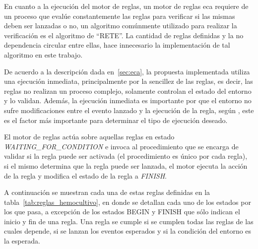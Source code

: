 
En cuanto a la ejecución del motor de reglas, un motor de reglas \gls{eca} requiere de 
un proceso que evalúe constantemente
las reglas para verificar si las mismas deben ser lanzadas o
no\cite{bailey2004event,galton2002two}, un algoritmo comúnmente utilizado para
realizar la verificación es el algoritmo de \enquote{RETE}\cite{de2001eca}. La cantidad de
reglas definidas y la no dependencia circular entre ellas, hace innecesario la
implementación de tal algoritmo en este trabajo\cite{de2001eca}. 

De acuerdo a la descripción dada en~\ref{sec:eca}, la propuesta implementada
utiliza una ejecución inmediata, principalmente por la sencillez de las reglas,
es decir, las reglas no realizan un proceso complejo, solamente controlan el
estado del entorno y lo validan. Además, la ejecución inmediata es importante
por que el entorno no sufre modificaciones entre el evento lanzado y la
ejecución de la regla, según \cite{bailey2004event}, este es el factor más
importante para determinar el tipo de ejecución deseado.

El motor de reglas actúa sobre aquellas reglas en estado
\emph{WAITING\_FOR\_CONDITION} e invoca al procedimiento que se encarga de
validar si la regla puede ser activada (el procedimiento es único por cada
regla), si el mismo determina que la regla puede ser lanzada, el motor ejecuta
la acción de la regla y modifica el estado de la regla a \emph{FINISH}.


A continuación se muestran cada una de estas reglas definidas en la
tabla~\ref{tab:reglas_hemocultivo}, en donde se detallan cada uno de los estados
por los que pasa, a excepción de los estados BEGIN y FINISH que sólo indican el
inicio y fin de una regla. Una regla se cumple si se cumplen todas las reglas de
las cuales depende, si se lanzan los eventos esperados y si la condición del
entorno es la esperada.


